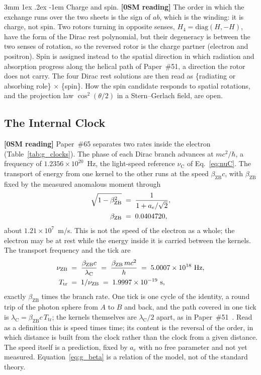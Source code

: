 \documentclass[%
 reprint, amsmath,amssymb, aps, prb, ]{revtex4-2}
\makeatletter
\numberwithin{equation}{section}
\renewcommand\paragraph{%
  \@startsection{paragraph}{4}{\z@}%
    {3mm \@plus 1ex \@minus .2ex}%
    {-1em}%
    {\normalfont\normalsize\itshape}}
\newcommand{\betaZB}{\beta_{\text{ZB}}}
\newcommand{\lambdaC}{\lambda_{\text{C}}}
\newcommand{\nuZB}{\nu_{\text{ZB}}}
\newcommand{\nuC}{\nu_{\text{C}}}
\newcommand{\Ttr}{T_{\text{tr}}}
\makeatother
\begin{document}
\paragraph{Charge and spin.} \textbf{[0SM reading]} The order in which the exchange runs over the two sheets is the sign of $ab$, which is the winding: it is charge, not spin. Two rotors turning in opposite senses, $H_4 = \mathrm{diag}(H,-H)$, have the form of the Dirac rest polynomial, but their degeneracy is between the two senses of rotation, so the reversed rotor is the charge partner (electron and positron). Spin is assigned instead to the spatial direction in which radiation and absorption progress along the helical path of Paper~\#51, a direction the rotor does not carry. The four Dirac rest solutions are then read as \{radiating or absorbing role\} $\times$ \{spin\}. How the spin candidate responds to spatial rotations, and the projection law $\cos^{2}(\theta/2)$ in a Stern--Gerlach field, are open.

\subsection{The Internal Clock}
\label{subsec:g_clock}

\textbf{[0SM reading]} Paper~\#65 separates two rates inside the electron (Table~\ref{tab:g_clocks}). The phase of each Dirac branch advances at $mc^{2}/\hbar$, a frequency of $1.2356\times10^{20}$~Hz, the light-speed reference $\nuC$ of Eq.~\eqref{eq:nuC}. The transport of energy from one kernel to the other runs at the speed $\betaZB c$, with $\betaZB$ fixed by the measured anomalous moment through
\begin{align}
\sqrt{1 - \betaZB^{2}} &\;=\; \frac{1}{1 + a_e/\sqrt{2}},
\notag\\
\betaZB &\;=\; 0.0404720 ,
\label{eq:g_beta}
\end{align}
about $1.21\times10^{7}$~m/s. This is not the speed of the electron as a whole; the electron may be at rest while the energy inside it is carried between the kernels. The transport frequency and the tick are
\begin{align}
\nuZB &\;=\; \frac{\betaZB c}{\lambdaC} \;=\; \frac{\betaZB\,mc^{2}}{h} \;=\; 5.0007\times10^{18}\ \text{Hz},
\notag\\
\Ttr &\;=\; 1/\nuZB \;=\; 1.9997\times10^{-19}\ \text{s},
\label{eq:g_tick}
\end{align}
exactly $\betaZB$ times the branch rate. One tick is one cycle of the identity, a round trip of the photon sphere from $A$ to $B$ and back, and the path covered in one tick is $\lambdaC = \betaZB c\,\Ttr$; the kernels themselves are $\lambdaC/2$ apart, as in Paper~\#51~\cite{hanamura51}. Read as a definition this is speed times time; its content is the reversal of the order, in which distance is built from the clock rather than the clock from a given distance. The speed itself is a prediction, fixed by $a_e$ with no free parameter and not yet measured. Equation~\eqref{eq:g_beta} is a relation of the model, not of the standard theory.
\end{document}
